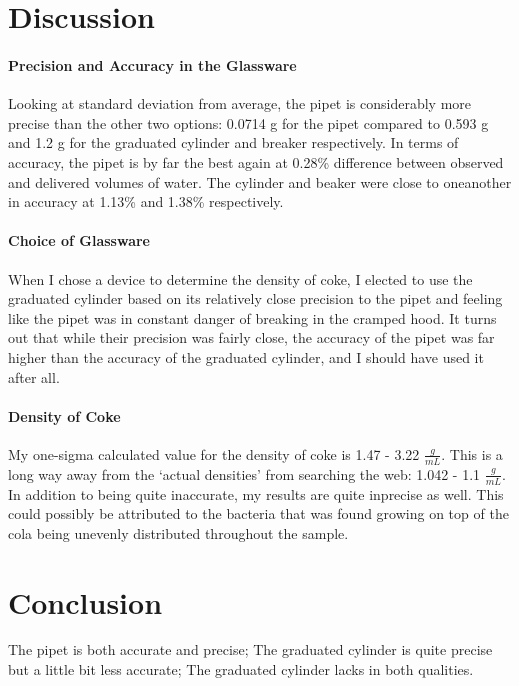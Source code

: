 \documentclass[11pt,letterpaper]{report}
\begin{document}
\section*{Discussion}
\paragraph{Precision and Accuracy in the Glassware}
Looking at standard deviation from average, the pipet is considerably more precise than the other two options: 0.0714 g for the pipet compared to 0.593 g and 1.2 g for the graduated cylinder and breaker respectively. In terms of accuracy, the pipet is by far the best again at 0.28\% difference between observed and delivered volumes of water. The cylinder and beaker were close to oneanother in accuracy at 1.13\% and 1.38\% respectively. 

\paragraph{Choice of Glassware}
When I chose a device to determine the density of coke, I elected to use the graduated cylinder based on its relatively close precision to the pipet and feeling like the pipet was in constant danger of breaking in the cramped hood. It turns out that while their precision was fairly close, the accuracy of the pipet was far higher than the accuracy of the graduated cylinder, and I should have used it after all.

\paragraph{Density of Coke}
My one-sigma calculated value for the density of coke is 1.47 - 3.22 $\frac{g}{mL}$. This is a long way away from the `actual densities' from searching the web: 1.042 - 1.1 $\frac{g}{mL}$. In addition to being quite inaccurate, my results are quite inprecise as well. This could possibly be attributed to the bacteria that was found growing on top of the cola being unevenly distributed throughout the sample. 


\section*{Conclusion}
The pipet is both accurate and precise; The graduated cylinder is quite precise but a little bit less accurate; The graduated cylinder lacks in both qualities. 
\end{document}
